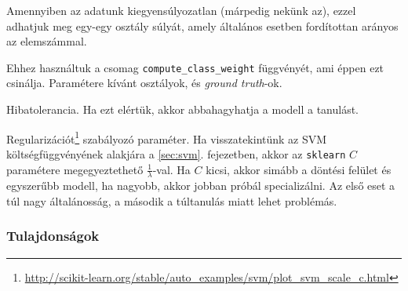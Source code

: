 
Amennyiben az adatunk kiegyensúlyozatlan (márpedig nekünk az), ezzel adhatjuk meg
 egy-egy osztály súlyát, amely általános esetben fordítottan arányos az elemszámmal.

Ehhez használtuk a csomag \texttt{compute\_class\_weight} függvényét, ami éppen ezt csinálja.
Paramétere  kívánt osztályok, és \textit{ground truth}-ok.



Hibatolerancia. Ha ezt elértük, akkor abbahagyhatja a modell a tanulást.





%
%

Regularizációt\footnote{\url{http://scikit-learn.org/stable/auto_examples/svm/plot_svm_scale_c.html}} szabályozó paraméter. Ha visszatekintünk az SVM költségfüggvényének alakjára a \ref{sec:svm}. fejezetben, akkor az \texttt{sklearn} $ C $ paramétere megegyeztethető $ \frac{1}{\lambda} $-val.
Ha $ C $ kicsi, akkor simább a döntési felület és egyszerűbb modell, ha nagyobb, akkor 
jobban próbál specializálni. Az első eset a túl nagy általánosság, a második a túltanulás
miatt lehet problémás.



\subsubsection{Tulajdonságok}

